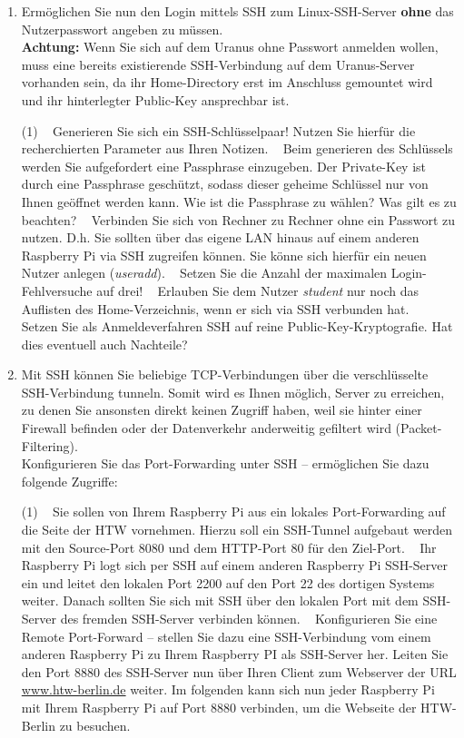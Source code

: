 \documentclass[paper=a4,fontsize=11pt]{scrartcl}%
\numberwithin{equation}{section}
\begin{document}
\begin{enumerate}
\begin{tasks}
\end{tasks}
	\item Ermöglichen Sie nun den Login mittels SSH zum Linux-SSH-Server \textbf{ohne} das Nutzerpasswort angeben zu müssen.\\
	\textbf{Achtung:} Wenn Sie sich auf dem Uranus ohne Passwort anmelden wollen, muss eine bereits existierende SSH-Verbindung auf dem Uranus-Server vorhanden sein, da ihr Home-Directory erst im Anschluss gemountet wird und ihr hinterlegter Public-Key ansprechbar ist.
\begin{tasks}(1)
	\task~ Generieren Sie sich ein SSH-Schlüsselpaar! Nutzen Sie hierfür die recherchierten Parameter aus Ihren Notizen.
	\task~ Beim generieren des Schlüssels werden Sie aufgefordert eine Passphrase einzugeben. Der Private-Key ist durch eine Passphrase geschützt, sodass dieser geheime Schlüssel nur von Ihnen geöffnet werden kann. Wie ist die Passphrase zu wählen? Was gilt es zu beachten?
	\task~ Verbinden Sie sich von Rechner zu Rechner ohne ein Passwort zu nutzen. D.h. Sie sollten über das eigene LAN hinaus auf einem anderen Raspberry Pi via SSH zugreifen können. Sie könne sich hierfür ein neuen Nutzer anlegen (\emph{useradd}).
	\task~ Setzen Sie die Anzahl der maximalen Login-Fehlversuche auf drei!
	\task~ Erlauben Sie dem Nutzer \emph{student} nur noch das Auflisten des Home-Verzeichnis, wenn er sich via SSH verbunden hat.
	\task~ Setzen Sie als Anmeldeverfahren SSH auf reine Public-Key-Kryptografie. Hat dies eventuell auch Nachteile?
\end{tasks}
	\item Mit SSH können Sie beliebige TCP-Verbindungen über die verschlüsselte SSH-Verbindung \glqq tunneln\grqq. Somit wird es Ihnen möglich, Server zu erreichen, zu denen Sie ansonsten direkt keinen Zugriff haben, weil sie hinter einer Firewall befinden oder der Datenverkehr anderweitig gefiltert wird (Packet-Filtering).\\
	Konfigurieren Sie das Port-Forwarding unter SSH -- ermöglichen Sie dazu folgende Zugriffe:
	\begin{tasks}(1)
		\task~ Sie sollen von Ihrem Raspberry Pi aus ein lokales Port-Forwarding auf die Seite der HTW vornehmen. Hierzu soll ein SSH-Tunnel aufgebaut werden mit den Source-Port 8080 und dem HTTP-Port 80 für den Ziel-Port.
		\task~ Ihr Raspberry Pi logt sich per SSH auf einem anderen Raspberry Pi SSH-Server ein und leitet den lokalen Port 2200 auf den Port 22 des dortigen Systems weiter. Danach sollten Sie sich mit SSH über den lokalen Port mit dem SSH-Server des fremden SSH-Server verbinden können.
		\task~ Konfigurieren Sie eine Remote Port-Forward -- stellen Sie dazu eine SSH-Verbindung vom einem anderen Raspberry Pi zu Ihrem Raspberry PI als SSH-Server her. Leiten Sie den Port 8880 des SSH-Server nun über Ihren Client zum Webserver der URL \url{www.htw-berlin.de} weiter. Im folgenden kann sich nun jeder Raspberry Pi mit Ihrem Raspberry Pi auf Port 8880 verbinden, um die Webseite der HTW-Berlin zu besuchen.
	\end{tasks}
\end{enumerate}
\end{document}
